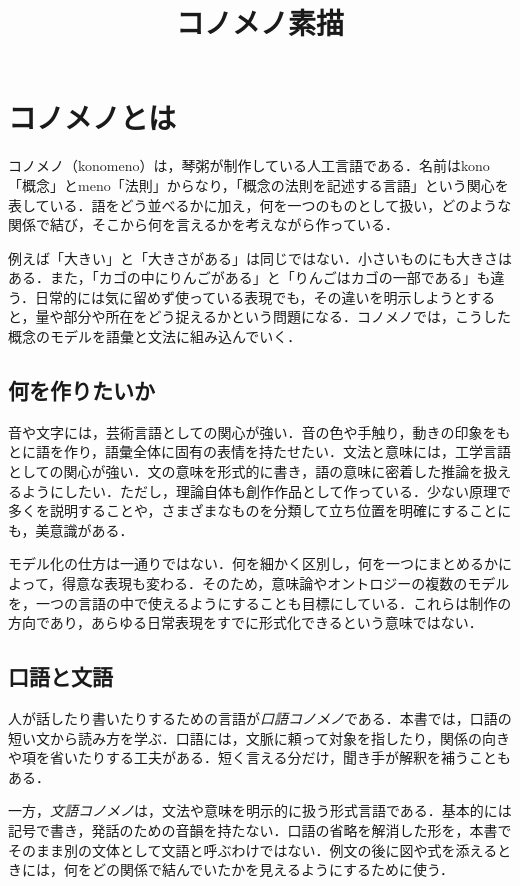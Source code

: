 \documentclass[b5paper, 10pt]{ltjsarticle}
\newcommand{\ko}[1]{\textsf{#1}}
\begin{document}
\title{コノメノ素描}
\author{}
\date{}
\maketitle
\setcounter{tocdepth}{1}
\tableofcontents

\section{コノメノとは}
コノメノ（\ko{konomeno}）は，琴粥が制作している人工言語である．名前は\ko{kono}「概念」と\ko{meno}「法則」からなり，「概念の法則を記述する言語」という関心を表している．語をどう並べるかに加え，何を一つのものとして扱い，どのような関係で結び，そこから何を言えるかを考えながら作っている．

例えば「大きい」と「大きさがある」は同じではない．小さいものにも大きさはある．また，「カゴの中にりんごがある」と「りんごはカゴの一部である」も違う．日常的には気に留めず使っている表現でも，その違いを明示しようとすると，量や部分や所在をどう捉えるかという問題になる．コノメノでは，こうした概念のモデルを語彙と文法に組み込んでいく．

\subsection{何を作りたいか}
音や文字には，芸術言語としての関心が強い．音の色や手触り，動きの印象をもとに語を作り，語彙全体に固有の表情を持たせたい．文法と意味には，工学言語としての関心が強い．文の意味を形式的に書き，語の意味に密着した推論を扱えるようにしたい．ただし，理論自体も創作作品として作っている．少ない原理で多くを説明することや，さまざまなものを分類して立ち位置を明確にすることにも，美意識がある．

モデル化の仕方は一通りではない．何を細かく区別し，何を一つにまとめるかによって，得意な表現も変わる．そのため，意味論やオントロジーの複数のモデルを，一つの言語の中で使えるようにすることも目標にしている．これらは制作の方向であり，あらゆる日常表現をすでに形式化できるという意味ではない．

\subsection{口語と文語}
人が話したり書いたりするための言語が\emph{口語コノメノ}である．本書では，口語の短い文から読み方を学ぶ．口語には，文脈に頼って対象を指したり，関係の向きや項を省いたりする工夫がある．短く言える分だけ，聞き手が解釈を補うこともある．

一方，\emph{文語コノメノ}は，文法や意味を明示的に扱う形式言語である．基本的には記号で書き，発話のための音韻を持たない．口語の省略を解消した形を，本書でそのまま別の文体として文語と呼ぶわけではない．例文の後に図や式を添えるときには，何をどの関係で結んでいたかを見えるようにするために使う．
\end{document}
